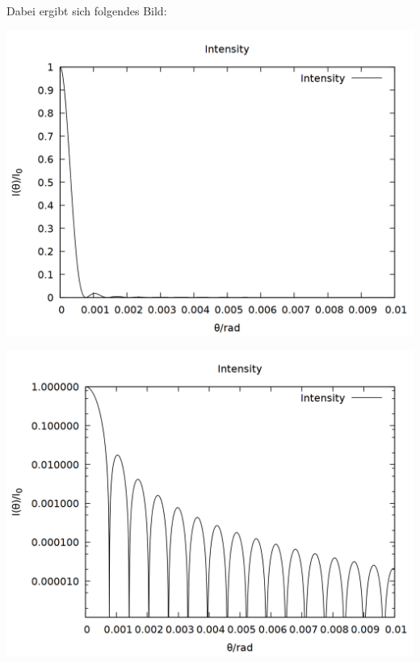 \documentclass{scrreprt}
\begin{document}
Dabei ergibt sich folgendes Bild:\\
\begin{center}
\includegraphics[scale=0.3]{5_plot_slit.png}
\end{center}
\begin{center}
\includegraphics[scale=0.3]{5_plot_slit_log.png}
\end{center}
\end{document}
